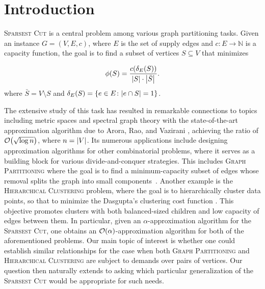 \section{Introduction}

\textsc{Sparsest Cut} is a central problem among various graph partitioning tasks. Given an instance $G=(V,E,c)$, where $E$ is the set of supply edges and $c\colon E \to \mathbb{N}$ is a capacity function, the goal is to find a subset of vertices $S\subseteq V$ that minimizes

\[
\phi\mathopen{}\left( S \right) = \frac{c\mathopen{}\left( \delta_E\mathopen{}\left( S \right) \right)}{\mathopen{}\left| S \right|\cdot \mathopen{}\left| \bar{S} \right|}.
\]
where $\bar{S}=V\setminus S$ and $\delta_E\mathopen{}\left( S \right)=\mathopen{}\left\{ e\in E\colon \mathopen{}\left| e\cap S \right|=1 \right\}$.

The extensive study of this task \cite{MulticommodityMaxFlowMinCutTheoremsAndTheirUseInDesigningApproximationAlgorithms} has resulted in remarkable connections to topics including metric spaces \cite{TheGeometryOfGraphsAndSomeOfItsAlgorithmicApplications,AnOlogkApproximateMinCutMaxFlowTheoremAndApproximationAlgorithm,OnLipschitzEmbeddingOfFiniteMetricSpacesInHilbertSpace,EuclideanDistortionAndTheSparsestCut} and spectral graph theory \cite{ALowerBoundForTheSmallestEigenvalueOfTheLaplacian,Lambda1IsoperimetricInequalitiesForGraphsAndSuperconcentrators,SpectralPartitioningWorksPlanarGraphsAndFiniteElementMeshes} with the state-of-the-art approximation algorithm due to Arora, Rao, and Vazirani \cite{ExpanderFlowsGeometricEmbeddingsAndGraphPartitioning}, achieving the ratio of $\mathcal{O}\mathopen{}\left( \sqrt{\log n} \right)$, where $n=\mathopen{}\left| V \right|$. Its numerous applications include designing approximation algorithms for other combinatorial problems, where it serves as a building block for various divide-and-conquer strategies. This includes \textsc{Graph Partitioning} where the goal is to find a minimum-capacity subset of edges whose removal splits the graph into small components~\cite{MulticommodityMaxFlowMinCutTheoremsAndTheirUseInDesigningApproximationAlgorithms}. Another example is the \textsc{Hierarchical Clustering} problem, where the goal is to hierarchically cluster data points, so that to minimize the Dasgupta's clustering cost function \cite{ACostFunctionForSimilarityBasedHierarchicalClustering,ApproximateHierarchicalClusteringViaSparsestCutAndSpreadingMetrics,HierarchicalClusteringObjectiveFunctionsAndAlgorithms}. This objective promotes clusters with both balanced-sized children and low capacity of edges between them. In particular, given an $\alpha$-approximation algorithm for the \textsc{Sparsest Cut}, one obtains an $\mathcal{O}\mathopen{}\left( \alpha \right)$-approximation algorithm for both of the aforementioned problems. 
Our main topic of interest is whether one could establish similar relationships for the case when both \textsc{Graph Partitioning} and \textsc{Hierarchical Clustering} are subject to demands over pairs of vertices. 
Our question then naturally extends to asking which particular generalization of the \textsc{Sparsest Cut} would be appropriate for such needs.

